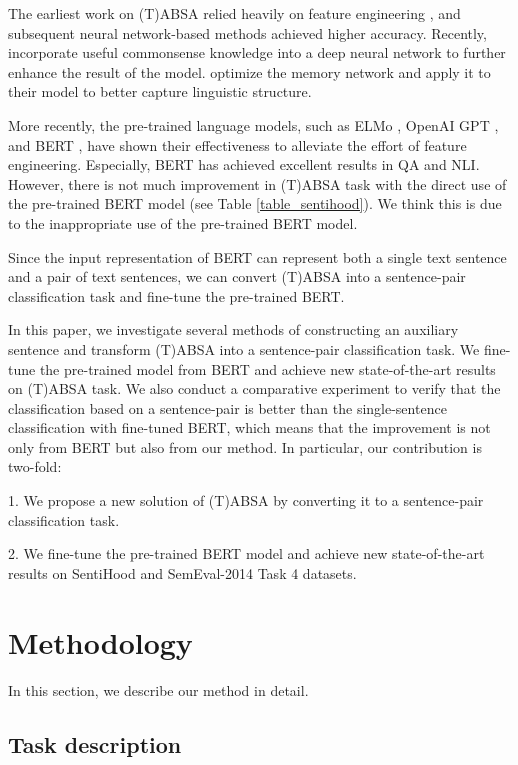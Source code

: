 \documentclass[11pt,a4paper]{article}
\theoremstyle{definition}
\begin{document}
	The earliest work on (T)ABSA relied heavily on feature engineering \cite{wagner2014dcu,kiritchenko2014nrc}, and subsequent neural network-based methods \cite{nguyen2015phrasernn,wang2016attention,tang2015effective,tang2016aspect,wang2017tdparse} achieved higher accuracy. Recently, \citet{ma2018targeted} incorporate useful commonsense knowledge into a deep neural network to further enhance the result of the model. \citet{liu2018recurrent} optimize the memory network and apply it to their model to better capture linguistic structure.

	More recently, the pre-trained language models, such as ELMo \cite{peters2018deep}, OpenAI GPT \cite{radford2018improving}, and BERT \cite{devlin2018bert}, have shown their effectiveness to alleviate the effort of feature engineering. Especially, BERT has achieved excellent results in QA and NLI. However, there is not much improvement in (T)ABSA task with the direct use of the pre-trained BERT model (see Table \ref{table_sentihood}). We think this is due to the inappropriate use of the pre-trained BERT model.

	Since the input representation of BERT can represent both a single text sentence and a pair of text sentences, we can convert (T)ABSA into a sentence-pair classification task and fine-tune the pre-trained BERT.
		
	In this paper, we investigate several methods of constructing an auxiliary sentence and transform (T)ABSA into a sentence-pair classification task. We fine-tune the pre-trained model from BERT and achieve new state-of-the-art results on (T)ABSA task. We also conduct a comparative experiment to verify that the classification based on a sentence-pair is better than the single-sentence classification with fine-tuned BERT, which means that the improvement is not only from BERT but also from our method. In particular, our contribution is two-fold:
	
	1. We propose a new solution of (T)ABSA by converting it to a sentence-pair classification task.
	
	2. We fine-tune the pre-trained BERT model and achieve new state-of-the-art results on SentiHood and SemEval-2014 Task 4 datasets.
	
	\section{Methodology}
	In this section, we describe our method in detail.

	\subsection{Task description}
\end{document}
